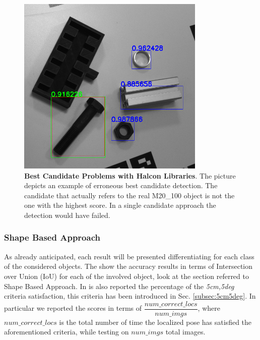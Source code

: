\begin{figure}
    \centering
    \includegraphics[width=0.8\textwidth]{figures/4_experiments/m20_100_halcon_detection_problems}
    \caption{\textbf{Best Candidate Problems with Halcon Libraries}. The picture depicts an example of erroneous best candidate detection. The candidate that actually refers to the real M20\_100 object is not the one with the highest score. In a single candidate approach the detection would have failed.}
    \label{fig:m20_100_halcon_detection_problems}
\end{figure}
\subsubsection{Shape Based Approach}
As already anticipated, each result will be presented differentiating for each class of the considered objects. The  show the accuracy results in terms of Intersection over Union (IoU) for each of the involved object, look at the section referred to Shape Based Approach. In  is also reported the percentage of the \emph{5cm,5deg} criteria satisfaction, this criteria has been introduced in Sec. \ref{subsec:5cm5deg}. In particular we reported the scores in terms of $\dfrac{num\_correct\_locs}{num\_imgs}$, where $num\_correct\_locs$ is the total number of time the localized pose has satisfied the aforementioned criteria, while testing on $num\_imgs$ total images.

